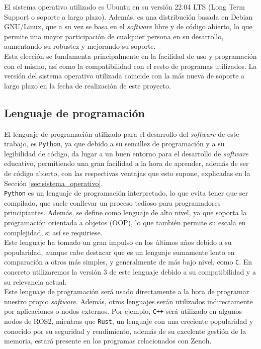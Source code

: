 El sistema operativo utilizado es Ubuntu en su versión 22.04 LTS (Long Term
Support o soporte a largo plazo).
Además, es una distribución basada en Debian GNU/Linux, que a su vez se basa en
el \textit{software} libre y de código abierto, lo que permite una mayor
participación de cualquier persona en su desarrollo, aumentando su robustez y
mejorando su soporte.
\\

Esta elección se fundamenta principalmente en la facilidad de uso y programación
con el mismo, así como la compatibilidad con el resto de programas utilizados.
La versión del sistema operativo utilizada coincide con la más nueva de soporte
a largo plazo en la fecha de realización de este proyecto.
\\


\subsection{Lenguaje de programación}
\label{sec:lenguaje_programacion}

El lenguaje de programación utilizado para el desarrollo del \textit{software}
de este trabajo, es \texttt{Python}, ya que debido a su sencillez de
programación y a su legibilidad de código, da lugar a un buen entorno para el
desarrollo de \textit{software} educativo, permitiendo una gran facilidad a la
hora de aprender, además de ser de código abierto, con las respectivas ventajas
que esto supone, explicadas en la Sección \ref{sec:sistema_operativo}.
\\

\texttt{Python} es un lenguaje de programación interpretado, lo que evita tener
que ser compilado, que suele conllevar un proceso tedioso para programadores
principiantes.
Además, se define como lenguaje de alto nivel, ya que soporta la programación
orientada a objetos (OOP), lo que también permite su escala en complejidad, si
así se requiriese.
\\

Este lenguaje ha tomado un gran impulso en los últimos años debido a su
popularidad, aunque cabe destacar que es un lenguaje sumamente lento en
comparación a otros más simples, y generalmente de más bajo nivel, como
\texttt{C}.
En concreto utilizaremos la versión 3 de este lenguaje debido a su
compatibilidad y a su relevancia actual.
\\

Este lenguaje de programación será usado directamente a la hora de programar
nuestro propio \textit{software}.
Además, otros lenguajes serán utilizados indirectamente por aplicaciones o nodos
externos.
Por ejemplo, \texttt{C++} será utilizado en algunos nodos de ROS2, mientras que
\texttt{Rust}, un lenguaje con una creciente popularidad y conocido por su
seguridad y rendimiento, además de su excelente gestión de la memoria, estará
presente en los programas relacionados con Zenoh.
\\

